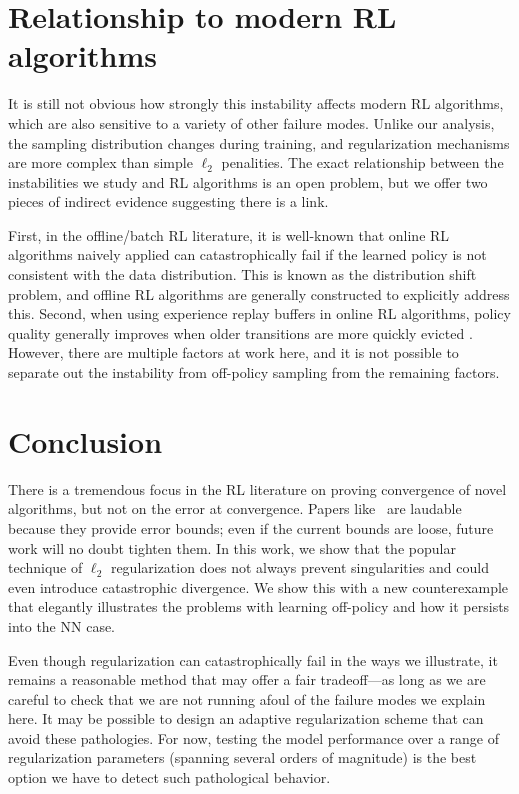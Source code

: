 \section{Relationship to modern RL algorithms}

It is still not obvious how strongly this instability affects modern RL algorithms, which are also sensitive to a variety of other failure modes. Unlike our analysis, the sampling distribution changes during training, and regularization mechanisms are more complex than simple $\ell_2$ penalities. The exact relationship between the instabilities we study and RL algorithms is an open problem, but we offer two pieces of indirect evidence suggesting there is a link.

First, in the offline/batch RL literature, it is well-known that online RL algorithms naively applied can catastrophically fail if the learned policy is not consistent with the data distribution. This is known as the distribution shift problem, \cite[p.~26]{levine2020offline} and offline RL algorithms are generally constructed to explicitly address this. Second, when using experience replay buffers in online RL algorithms, policy quality generally improves when older transitions are more quickly evicted \cite{fedus2020revisiting}. However, there are multiple factors at work here, and it is not possible to separate out the instability from off-policy sampling from the remaining factors.


\section{Conclusion}

There is a tremendous focus in the RL literature on proving convergence of novel algorithms, but not on the error at convergence. Papers like~\cite{zhang2021breaking} are laudable because they provide error bounds; even if the current bounds are loose, future work will no doubt tighten them.
In this work, we show that the popular technique of $\ell_2$ regularization does not always prevent singularities and could even introduce catastrophic divergence. We show this with a new counterexample that elegantly illustrates the problems with learning off-policy and how it persists into the NN case.

Even though regularization can catastrophically fail in the ways we illustrate, it remains a reasonable method that may offer a fair tradeoff---as long as we are careful to check that we are not running afoul of the failure modes we explain here. It may be possible to design an adaptive regularization scheme that can avoid these pathologies. For now, testing the model performance over a range of regularization parameters (spanning several orders of magnitude) is the best option we have to detect such pathological behavior.

